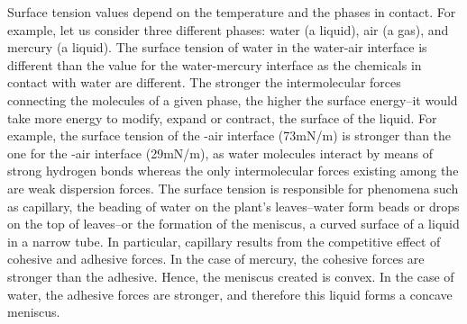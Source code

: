 \documentclass[main.tex]{subfiles}
\newcommand\chapterlabel{solids}
\begin{document}
\begin{description}
\begin{center}
{\begin{tikzpicture}
\end{tikzpicture}}
  \end{center}
Surface tension values depend on the temperature and the phases in contact. For example, let us consider three different phases: water (a liquid), air (a gas), and mercury (a liquid). The surface tension of water in the water-air interface is different than the value for the water-mercury interface as the chemicals in contact with water are different. The stronger the intermolecular forces connecting the molecules of a given phase, the higher the surface energy--it would take more energy to modify, expand or contract, the surface of the liquid. For example, the surface tension of the -air interface (73mN/m)
is stronger than the one for the -air interface (29mN/m), as water molecules interact by means of strong hydrogen bonds whereas the only intermolecular forces existing among the  are weak dispersion forces. The surface tension is responsible for phenomena such as capillary, the beading of water on the plant's leaves--water form beads or drops on the top of leaves--or the formation of the meniscus, a curved surface of a liquid in a narrow tube. In particular, capillary results from the competitive effect of cohesive and adhesive forces. In the case of mercury, the cohesive forces are stronger than the adhesive. Hence, the meniscus created is convex. In the case of water, the adhesive forces are stronger, and therefore this liquid forms a concave meniscus.




\end{description}
\end{document}
